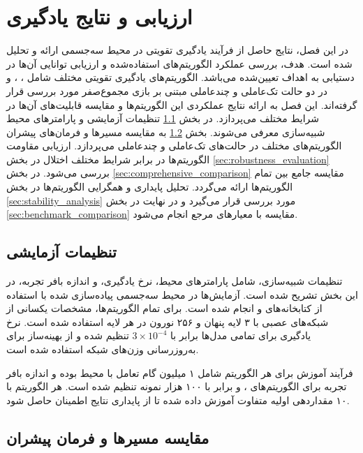\chapter{ارزیابی و نتایج یادگیری}

در این فصل، نتایج حاصل از فرآیند یادگیری تقویتی در محیط سه‌جسمی ارائه و تحلیل شده است. هدف، بررسی عملکرد الگوریتم‌های استفاده‌شده و ارزیابی توانایی آن‌ها در دستیابی به اهداف تعیین‌شده می‌باشد. الگوریتم‌های یادگیری تقویتی مختلف شامل ، ،  و  در دو حالت تک‌عاملی و چندعاملی مبتنی بر بازی مجموع‌صفر مورد بررسی قرار گرفته‌اند. این فصل به ارائه نتایج عملکردی این الگوریتم‌ها و مقایسه قابلیت‌های آن‌ها در شرایط مختلف می‌پردازد. در بخش \ref{sec:experimental_setup} تنظیمات آزمایشی و پارامترهای محیط شبیه‌سازی معرفی می‌شوند. بخش \ref{sec:trajectory_comparison} به مقایسه مسیرها و فرمان‌های پیشران الگوریتم‌های مختلف در حالت‌های تک‌عاملی و چندعاملی می‌پردازد. ارزیابی مقاومت الگوریتم‌ها در برابر شرایط مختلف اختلال در بخش \ref{sec:robustness_evaluation} بررسی می‌شود. در بخش \ref{sec:comprehensive_comparison} مقایسه جامع بین تمام الگوریتم‌ها ارائه می‌گردد. تحلیل پایداری و همگرایی الگوریتم‌ها در بخش \ref{sec:stability_analysis} مورد بررسی قرار می‌گیرد و در نهایت در بخش \ref{sec:benchmark_comparison} مقایسه با معیارهای مرجع انجام می‌شود.

\section{تنظیمات آزمایشی}
\label{sec:experimental_setup}

تنظیمات شبیه‌سازی، شامل پارامترهای محیط، نرخ یادگیری، و اندازه بافر تجربه، در این بخش تشریح شده است. آزمایش‌ها در محیط سه‌جسمی پیاده‌سازی شده با استفاده از کتابخانه‌های  و  انجام شده است. برای تمام الگوریتم‌ها، مشخصات یکسانی از شبکه‌های عصبی با ۳ لایه پنهان و ۲۵۶ نورون در هر لایه استفاده شده است. نرخ یادگیری برای تمامی مدل‌ها برابر با $3 \times 10^{-4}$ تنظیم شده و از بهینه‌ساز  برای به‌روزرسانی وزن‌های شبکه استفاده شده است.

فرآیند آموزش برای هر الگوریتم شامل ۱ میلیون گام تعامل با محیط بوده و اندازه بافر تجربه برای الگوریتم‌های ،  و  برابر با ۱۰۰ هزار نمونه تنظیم شده است. هر الگوریتم با ۱۰ مقداردهی اولیه متفاوت آموزش داده شده تا از پایداری نتایج اطمینان حاصل شود.

\section{مقایسه مسیرها و فرمان پیشران}
\label{sec:trajectory_comparison}

